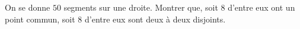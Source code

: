 On se donne $50$ segments sur une droite. Montrer que, soit $8$ d'entre eux ont un point commun, soit $8$ d'entre eux sont deux à deux disjoints.

